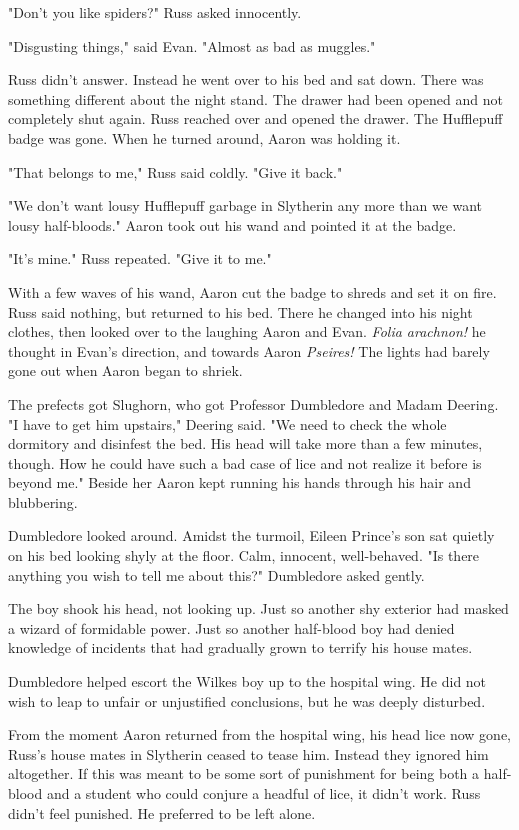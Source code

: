 "Don't you{\el} like spiders?" Russ asked innocently.

"Disgusting things," said Evan. "Almost as bad as muggles."

Russ didn't answer. Instead he went over to his bed and sat down. There was something different about the night stand. The drawer had been opened and not completely shut again. Russ reached over and opened the drawer. The Hufflepuff badge was gone. When he turned around, Aaron was holding it.

"That belongs{\el} to me," Russ said coldly. "Give{\el} it back."

"We don't want lousy Hufflepuff garbage in Slytherin any more than we want lousy half-bloods." Aaron took out his wand and pointed it at the badge.

"It's mine." Russ repeated. "Give it to me."

With a few waves of his wand, Aaron cut the badge to shreds and set it on fire. Russ said nothing, but returned to his bed. There he changed into his night clothes, then looked over to the laughing Aaron and Evan. \emph{Folia arachnon!} he thought in Evan's direction, and towards Aaron \emph{Pseires!} The lights had barely gone out when Aaron began to shriek.

The prefects got Slughorn, who got Professor Dumbledore and Madam Deering. "I have to get him upstairs," Deering said. "We need to check the whole dormitory and disinfest the bed. His head will take more than a few minutes, though. How he could have such a bad case of lice and not realize it before is beyond me." Beside her Aaron kept running his hands through his hair and blubbering.

Dumbledore looked around. Amidst the turmoil, Eileen Prince's son sat quietly on his bed looking shyly at the floor. Calm, innocent, well-behaved. "Is there anything you wish to tell me about this?" Dumbledore asked gently.

The boy shook his head, not looking up. Just so another shy exterior had masked a wizard of formidable power. Just so another half-blood boy had denied knowledge of incidents that had gradually grown to terrify his house mates.

Dumbledore helped escort the Wilkes boy up to the hospital wing. He did not wish to leap to unfair or unjustified conclusions, but he was deeply disturbed.

From the moment Aaron returned from the hospital wing, his head lice now gone, Russ's house mates in Slytherin ceased to tease him. Instead they ignored him altogether. If this was meant to be some sort of punishment for being both a half-blood and a student who could conjure a headful of lice, it didn't work. Russ didn't feel punished. He preferred to be left alone.

